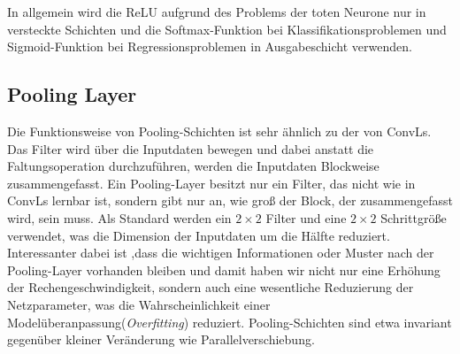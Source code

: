 \documentclass[12pt,a4paper]{scrartcl}
\numberwithin{equation}{section}
\begin{document}
In allgemein wird die ReLU aufgrund des Problems der toten Neurone nur in versteckte Schichten und die Softmax-Funktion bei Klassifikationsproblemen und Sigmoid-Funktion bei Regressionsproblemen in Ausgabeschicht verwenden.

\subsection{Pooling Layer}
Die Funktionsweise von Pooling-Schichten ist sehr ähnlich zu der von \acsp{ConvL}. Das Filter wird über die Inputdaten bewegen und dabei anstatt die Faltungsoperation durchzuführen, werden die Inputdaten Blockweise zusammengefasst. Ein Pooling-Layer besitzt nur ein Filter, das nicht wie in \acsp{ConvL} lernbar ist, sondern gibt nur an, wie groß der Block, der zusammengefasst wird, sein muss.
Als Standard werden ein $ 2 \times 2 $ Filter und eine $ 2 \times 2 $ Schrittgröße verwendet, was die Dimension der Inputdaten um die Hälfte reduziert. Interessanter dabei ist ,dass die wichtigen Informationen oder Muster nach der Pooling-Layer vorhanden bleiben und damit haben wir nicht nur eine Erhöhung der Rechengeschwindigkeit, sondern auch eine wesentliche Reduzierung der Netzparameter, was die Wahrscheinlichkeit einer Modelüberanpassung(\textit{Overfitting}) reduziert. Pooling-Schichten sind etwa invariant gegenüber kleiner Veränderung wie Parallelverschiebung\cite{4}.
\end{document}
